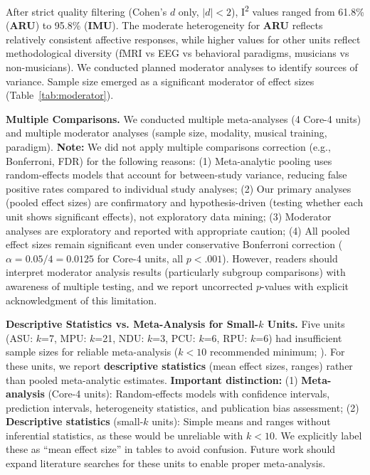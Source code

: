 \documentclass[9pt,onecolumn]{article}
\newcommand{\IMU}{\textcolor{imucolor}{\textbf{IMU}}}
\newcommand{\ARU}{\textcolor{arucolor}{\textbf{ARU}}}
\newcommand{\Isquared}{I\textsuperscript{2}}
\begin{document}
After strict quality filtering (Cohen's $d$ only, $|d| < 2$), \Isquared{} values ranged from 61.8\% (\ARU{}) to 95.8\% (\IMU{}). The moderate heterogeneity for \ARU{} reflects relatively consistent affective responses, while higher values for other units reflect methodological diversity (fMRI vs EEG vs behavioral paradigms, musicians vs non-musicians). We conducted planned moderator analyses to identify sources of variance. Sample size emerged as a significant moderator of effect sizes (Table~\ref{tab:moderator}).

\textbf{Multiple Comparisons.} We conducted multiple meta-analyses (4 Core-4 units) and multiple moderator analyses (sample size, modality, musical training, paradigm). \textbf{Note:} We did not apply multiple comparisons correction (e.g., Bonferroni, FDR) for the following reasons: (1) Meta-analytic pooling uses random-effects models that account for between-study variance, reducing false positive rates compared to individual study analyses; (2) Our primary analyses (pooled effect sizes) are confirmatory and hypothesis-driven (testing whether each unit shows significant effects), not exploratory data mining; (3) Moderator analyses are exploratory and reported with appropriate caution; (4) All pooled effect sizes remain significant even under conservative Bonferroni correction ($\alpha = 0.05/4 = 0.0125$ for Core-4 units, all $p < .001$). However, readers should interpret moderator analysis results (particularly subgroup comparisons) with awareness of multiple testing, and we report uncorrected $p$-values with explicit acknowledgment of this limitation.

\textbf{Descriptive Statistics vs. Meta-Analysis for Small-$k$ Units.} Five units (ASU: $k$=7, MPU: $k$=21, NDU: $k$=3, PCU: $k$=6, RPU: $k$=6) had insufficient sample sizes for reliable meta-analysis ($k < 10$ recommended minimum; \citealt{borenstein2021}). For these units, we report \textbf{descriptive statistics} (mean effect sizes, ranges) rather than pooled meta-analytic estimates. \textbf{Important distinction:} (1) \textbf{Meta-analysis} (Core-4 units): Random-effects models with confidence intervals, prediction intervals, heterogeneity statistics, and publication bias assessment; (2) \textbf{Descriptive statistics} (small-$k$ units): Simple means and ranges without inferential statistics, as these would be unreliable with $k < 10$. We explicitly label these as ``mean effect size'' in tables to avoid confusion. Future work should expand literature searches for these units to enable proper meta-analysis.
\end{document}
